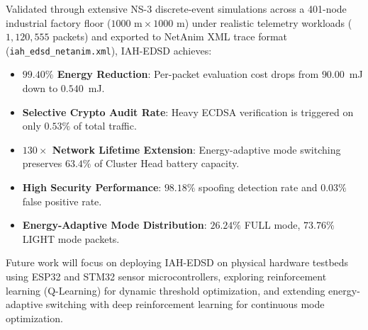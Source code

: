 \documentclass[journal]{IEEEtran}
\begin{document}
Validated through extensive NS-3 discrete-event simulations across a 401-node industrial factory floor ($1000\text{ m} \times 1000\text{ m}$) under realistic telemetry workloads ($1,120,555$ packets) and exported to NetAnim XML trace format (\texttt{iah\_edsd\_netanim.xml}), IAH-EDSD achieves:
\begin{itemize}
    \item \textbf{$99.40\%$ Energy Reduction}: Per-packet evaluation cost drops from $90.00$~mJ down to $0.540$~mJ.
    \item \textbf{Selective Crypto Audit Rate}: Heavy ECDSA verification is triggered on only $0.53\%$ of total traffic.
    \item \textbf{$130\times$ Network Lifetime Extension}: Energy-adaptive mode switching preserves $63.4\%$ of Cluster Head battery capacity.
    \item \textbf{High Security Performance}: $98.18\%$ spoofing detection rate and $0.03\%$ false positive rate.
    \item \textbf{Energy-Adaptive Mode Distribution}: $26.24\%$ FULL mode, $73.76\%$ LIGHT mode packets.
\end{itemize}

Future work will focus on deploying IAH-EDSD on physical hardware testbeds using ESP32 and STM32 sensor microcontrollers, exploring reinforcement learning (Q-Learning) for dynamic threshold optimization, and extending energy-adaptive switching with deep reinforcement learning for continuous mode optimization.
\end{document}

